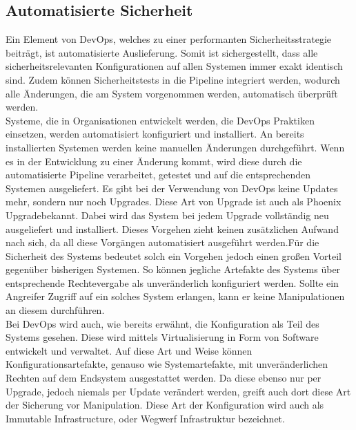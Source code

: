 \subsection{Automatisierte Sicherheit}
Ein Element von DevOps, welches zu einer performanten Sicherheitsstrategie beiträgt, ist automatisierte Auslieferung. Somit ist sichergestellt, dass alle sicherheitsrelevanten Konfigurationen auf allen Systemen immer exakt identisch sind. Zudem können Sicherheitstests in die Pipeline integriert werden, wodurch alle Änderungen, die am System vorgenommen werden, automatisch überprüft werden.\\
Systeme, die in Organisationen entwickelt werden, die DevOps Praktiken einsetzen, werden automatisiert konfiguriert und installiert. An bereits installierten Systemen werden keine manuellen Änderungen durchgeführt. Wenn es in der Entwicklung zu einer Änderung kommt, wird diese durch die automatisierte Pipeline verarbeitet, getestet und auf die entsprechenden Systemen ausgeliefert. Es gibt bei der Verwendung von DevOps keine Updates mehr, sondern nur noch Upgrades. Diese Art von Upgrade ist auch als \glqq Phoenix Upgrade\grqq bekannt. Dabei wird das System bei jedem Upgrade vollständig neu ausgeliefert und installiert. Dieses Vorgehen zieht keinen zusätzlichen Aufwand nach sich, da all diese Vorgängen automatisiert ausgeführt werden.Für die Sicherheit des Systems bedeutet solch ein Vorgehen jedoch einen großen Vorteil gegenüber bisherigen Systemen. So können jegliche Artefakte des Systems über entsprechende Rechtevergabe als unveränderlich konfiguriert werden. Sollte ein Angreifer Zugriff auf ein solches System erlangen, kann er keine Manipulationen an diesem durchführen.\\
Bei DevOps wird auch, wie bereits erwähnt, die Konfiguration als Teil des Systems gesehen. Diese wird mittels Virtualisierung in Form von Software entwickelt und verwaltet. Auf diese Art und Weise können Konfigurationsartefakte, genauso wie Systemartefakte, mit unveränderlichen Rechten auf dem Endsystem ausgestattet werden. Da diese ebenso nur per Upgrade, jedoch niemals per Update verändert werden, greift auch dort diese Art der Sicherung vor Manipulation. Diese Art der Konfiguration wird auch als \glqq Immutable Infrastructure\grqq, oder \glqq Wegwerf Infrastruktur\grqq \parencite[Vgl.][S. 16]{matthias:2015} bezeichnet.\\
